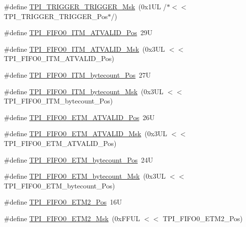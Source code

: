 \begin{DoxyCompactItemize}
\item 
\#define \hyperlink{group___c_m_s_i_s___t_p_i_ga814227af2b2665a0687bb49345e21110}{T\-P\-I\-\_\-\-T\-R\-I\-G\-G\-E\-R\-\_\-\-T\-R\-I\-G\-G\-E\-R\-\_\-\-Msk}~(0x1\-U\-L /$\ast$$<$$<$ T\-P\-I\-\_\-\-T\-R\-I\-G\-G\-E\-R\-\_\-\-T\-R\-I\-G\-G\-E\-R\-\_\-\-Pos$\ast$/)
\item 
\#define \hyperlink{group___c_m_s_i_s___t_p_i_gaa7e050e9eb6528241ebc6835783b6bae}{T\-P\-I\-\_\-\-F\-I\-F\-O0\-\_\-\-I\-T\-M\-\_\-\-A\-T\-V\-A\-L\-I\-D\-\_\-\-Pos}~29\-U
\item 
\#define \hyperlink{group___c_m_s_i_s___t_p_i_ga94cb2493ed35d2dab7bd4092b88a05bc}{T\-P\-I\-\_\-\-F\-I\-F\-O0\-\_\-\-I\-T\-M\-\_\-\-A\-T\-V\-A\-L\-I\-D\-\_\-\-Msk}~(0x3\-U\-L $<$$<$ T\-P\-I\-\_\-\-F\-I\-F\-O0\-\_\-\-I\-T\-M\-\_\-\-A\-T\-V\-A\-L\-I\-D\-\_\-\-Pos)
\item 
\#define \hyperlink{group___c_m_s_i_s___t_p_i_gac2b6f7f13a2fa0be4aa7645a47dcac52}{T\-P\-I\-\_\-\-F\-I\-F\-O0\-\_\-\-I\-T\-M\-\_\-bytecount\-\_\-\-Pos}~27\-U
\item 
\#define \hyperlink{group___c_m_s_i_s___t_p_i_ga07bafa971b8daf0d63b3f92b9ae7fa16}{T\-P\-I\-\_\-\-F\-I\-F\-O0\-\_\-\-I\-T\-M\-\_\-bytecount\-\_\-\-Msk}~(0x3\-U\-L $<$$<$ T\-P\-I\-\_\-\-F\-I\-F\-O0\-\_\-\-I\-T\-M\-\_\-bytecount\-\_\-\-Pos)
\item 
\#define \hyperlink{group___c_m_s_i_s___t_p_i_ga7fdeb3e465ca4aa9e3b2f424ab3bbd1d}{T\-P\-I\-\_\-\-F\-I\-F\-O0\-\_\-\-E\-T\-M\-\_\-\-A\-T\-V\-A\-L\-I\-D\-\_\-\-Pos}~26\-U
\item 
\#define \hyperlink{group___c_m_s_i_s___t_p_i_ga4f0005dc420b28f2369179a935b9a9d3}{T\-P\-I\-\_\-\-F\-I\-F\-O0\-\_\-\-E\-T\-M\-\_\-\-A\-T\-V\-A\-L\-I\-D\-\_\-\-Msk}~(0x3\-U\-L $<$$<$ T\-P\-I\-\_\-\-F\-I\-F\-O0\-\_\-\-E\-T\-M\-\_\-\-A\-T\-V\-A\-L\-I\-D\-\_\-\-Pos)
\item 
\#define \hyperlink{group___c_m_s_i_s___t_p_i_ga2f738e45386ebf58c4d406f578e7ddaf}{T\-P\-I\-\_\-\-F\-I\-F\-O0\-\_\-\-E\-T\-M\-\_\-bytecount\-\_\-\-Pos}~24\-U
\item 
\#define \hyperlink{group___c_m_s_i_s___t_p_i_gad2536b3a935361c68453cd068640af92}{T\-P\-I\-\_\-\-F\-I\-F\-O0\-\_\-\-E\-T\-M\-\_\-bytecount\-\_\-\-Msk}~(0x3\-U\-L $<$$<$ T\-P\-I\-\_\-\-F\-I\-F\-O0\-\_\-\-E\-T\-M\-\_\-bytecount\-\_\-\-Pos)
\item 
\#define \hyperlink{group___c_m_s_i_s___t_p_i_ga5f0037cc80c65e86d9e94e5005077a48}{T\-P\-I\-\_\-\-F\-I\-F\-O0\-\_\-\-E\-T\-M2\-\_\-\-Pos}~16\-U
\item 
\#define \hyperlink{group___c_m_s_i_s___t_p_i_gaa82a7b9b99c990fb12eafb3c84b68254}{T\-P\-I\-\_\-\-F\-I\-F\-O0\-\_\-\-E\-T\-M2\-\_\-\-Msk}~(0x\-F\-F\-U\-L $<$$<$ T\-P\-I\-\_\-\-F\-I\-F\-O0\-\_\-\-E\-T\-M2\-\_\-\-Pos)
$$
\end{DoxyCompactItemize}
